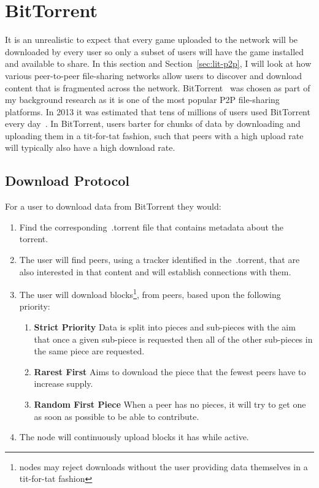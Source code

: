 
\section{BitTorrent}\label{sec:bittorrent}

It is an unrealistic to expect that every game uploaded to the network will be downloaded by every user so only a subset of users will have the game installed and available to share.
In this section and Section~\ref{sec:lit-p2p}, I will look at how various peer-to-peer file-sharing networks allow users to discover and download content that is fragmented across the network.
\x
BitTorrent~\cite{kaune_unraveling_2010,pouwelse_bittorrent_2005} was chosen as part of my background research as it is one of the most popular P2P file-sharing platforms. In 2013 it was estimated that tens of millions of users used BitTorrent every day~\cite{wang_measuring_2013}.
In BitTorrent, users barter for chunks of data by downloading and uploading them in a tit-for-tat fashion, such that peers with a high upload rate will typically also have a high download rate.


\subsection*{Download Protocol}\label{subsec:bittorrent-download}

For a user to download data from BitTorrent they would:

\begin{enumerate}
  \item Find the corresponding~.torrent file that contains metadata about the torrent.
  \item The user will find peers, using a tracker identified in the~.torrent, that are also interested in that content and will establish connections with them.
  \item The user will download blocks\footnote{nodes may reject downloads without the user providing data themselves in a tit-for-tat fashion}, from peers, based upon the following priority:
        \begin{enumerate}
          \item \textbf{Strict Priority} Data is split into pieces and sub-pieces with the aim that once a given sub-piece is requested then all of the other sub-pieces in the same piece are requested.
          \item \textbf{Rarest First} Aims to download the piece that the fewest peers have to increase supply.
          \item \textbf{Random First Piece} When a peer has no pieces, it will try to get one as soon as possible to be able to contribute.
        \end{enumerate}
  \item The node will continuously upload blocks it has while active.
\end{enumerate}

